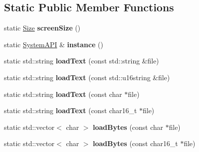 \subsection*{Static Public Member Functions}
\begin{DoxyCompactItemize}
\item 
\hypertarget{class_tempest_1_1_system_a_p_i_a149827541b2b84e84adb00b3f09dead8}{static \hyperlink{struct_tempest_1_1_size}{Size} {\bfseries screen\+Size} ()}\label{class_tempest_1_1_system_a_p_i_a149827541b2b84e84adb00b3f09dead8}

\item 
\hypertarget{class_tempest_1_1_system_a_p_i_a61eb14f8e3ce2b87bab35b953caaf738}{static \hyperlink{class_tempest_1_1_system_a_p_i}{System\+A\+P\+I} \& {\bfseries instance} ()}\label{class_tempest_1_1_system_a_p_i_a61eb14f8e3ce2b87bab35b953caaf738}

\item 
\hypertarget{class_tempest_1_1_system_a_p_i_ae74b5d024f757e90e82b7c894b11bace}{static std\+::string {\bfseries load\+Text} (const std\+::string \&file)}\label{class_tempest_1_1_system_a_p_i_ae74b5d024f757e90e82b7c894b11bace}

\item 
\hypertarget{class_tempest_1_1_system_a_p_i_aa7e49981513004733037eee4f5ca2c51}{static std\+::string {\bfseries load\+Text} (const std\+::u16string \&file)}\label{class_tempest_1_1_system_a_p_i_aa7e49981513004733037eee4f5ca2c51}

\item 
\hypertarget{class_tempest_1_1_system_a_p_i_a50992215605089068e96b97568fb285e}{static std\+::string {\bfseries load\+Text} (const char $\ast$file)}\label{class_tempest_1_1_system_a_p_i_a50992215605089068e96b97568fb285e}

\item 
\hypertarget{class_tempest_1_1_system_a_p_i_a2d1892f0ce8862aefbf301528e21e1a3}{static std\+::string {\bfseries load\+Text} (const char16\+\_\+t $\ast$file)}\label{class_tempest_1_1_system_a_p_i_a2d1892f0ce8862aefbf301528e21e1a3}

\item 
\hypertarget{class_tempest_1_1_system_a_p_i_a14739a1272c76516012d42eb4d0db416}{static std\+::vector$<$ char $>$ {\bfseries load\+Bytes} (const char $\ast$file)}\label{class_tempest_1_1_system_a_p_i_a14739a1272c76516012d42eb4d0db416}

\item 
\hypertarget{class_tempest_1_1_system_a_p_i_a7b8f4fe69f2146f5aa7f4e9cf27fd44d}{static std\+::vector$<$ char $>$ {\bfseries load\+Bytes} (const char16\+\_\+t $\ast$file)}\label{class_tempest_1_1_system_a_p_i_a7b8f4fe69f2146f5aa7f4e9cf27fd44d}


\end{DoxyCompactItemize}

